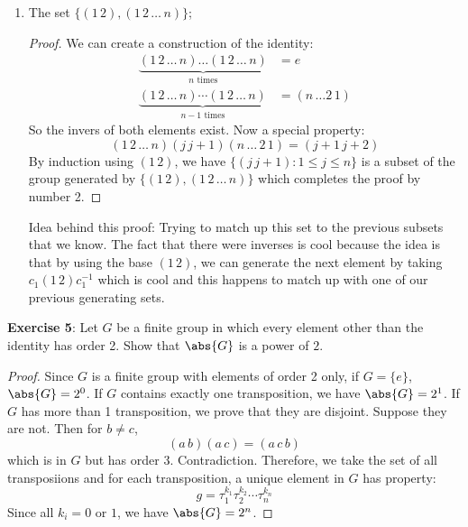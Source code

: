 \documentclass{article}
\begin{document}
\begin{enumerate}
	\item The set $\{(1 \, 2), (1 \, 2 \, \ldots \, n)\}$;
		\begin{proof}
			We can create a construction of the identity:
			\begin{align*}
				\underbrace{(1 \, 2 \, \ldots \, n)\ldots(1 \, 2 \, \ldots \, n)}_{n \text{ times}} &= e \\
				\underbrace{(1 \, 2 \, \ldots \, n)\cdots(1 \, 2\, \ldots \, n)}_{n - 1 \text{ times}} &= (n \, \ldots 2 \, 1)
			\end{align*}
			So the invers of both elements exist. Now a special property:
			\begin{equation*}
				(1 \, 2 \, \ldots \, n)(j \, j + 1)(n \, \ldots \, 2 \, 1) = (j + 1 \, j + 2)
			\end{equation*}
			By induction using $(1 \, 2)$, we have $\{(j \, j + 1) : 1 \leq j \leq n\}$ is a subset of the group generated by $\{(1 \, 2), (1 \, 2 \, \ldots \, n)\}$ which completes the proof by number 2.
		\end{proof}
		Idea behind this proof: Trying to match up this set to the previous subsets that we know. The fact that there were inverses is cool because the idea is that by using the base $(1 \, 2)$, we can generate the next element by taking $c_{1}(1 \, 2)c_{1}^{-1}$ which is cool and this happens to match up with one of our previous generating sets.
\end{enumerate}

\textbf{Exercise 5}: Let $G$ be a finite group in which every element other than the identity has order 2. Show that $\abs{G}$ is a power of $2$.
\begin{proof}
	Since $G$ is a finite group with elements of order 2 only, if $G = \{e\}$, $\abs{G} = 2^{0}$. If $G$ contains exactly one transposition, we have $\abs{G} = 2^{1}$. If $G$ has more than 1 transposition, we prove that they are disjoint. Suppose they are not. Then for $b \neq c$,
	\begin{equation*}
		(a \, b)(a \, c) = (a \, c \, b)
	\end{equation*}
	which is in $G$ but has order $3$. Contradiction. Therefore, we take the set of all transposiions and for each transposition, a unique element in $G$ has property:
	\begin{equation*}
		g = \tau_{1}^{k_{1}}\tau_{2}^{k_{2}}\cdots\tau_{n}^{k_{n}}
	\end{equation*}
	Since all $k_{i} = 0$ or $1$, we have $\abs{G} = 2^{n}$.
\end{proof}
\end{document}
